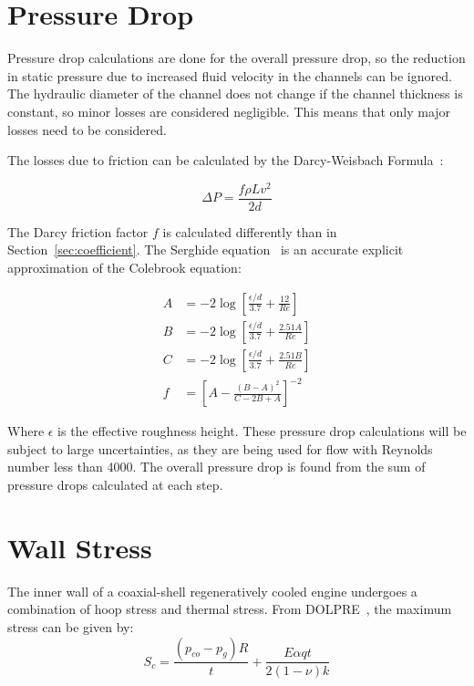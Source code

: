 \documentclass[11pt]{article}
\begin{document}
\section{Pressure Drop}

Pressure drop calculations are done for the overall pressure drop, so the reduction in static pressure due to increased fluid velocity in the channels can be ignored. The hydraulic diameter of the channel does not change if the channel thickness is constant, so minor losses are considered negligible. This means that only major losses need to be considered.

The losses due to friction can be calculated by the Darcy-Weisbach Formula~\cite{2009crane}:

\begin{equation}
  \Delta P = \frac{f \rho L v^2}{2d}
\end{equation}

The Darcy friction factor $f$ is calculated differently than in Section~\ref{sec:coefficient}. The Serghide equation~\cite{2009crane} is an accurate explicit approximation of the Colebrook equation:

\begin{align}
  A & = -2 \log \left[\frac{\epsilon / d}{3.7} + \frac{12}{Re} \right] \nonumber \\
  B & = -2 \log \left[ \frac{\epsilon / d}{3.7} + \frac{2.51A}{Re}\right] \nonumber \\
  C & = -2 \log \left[ \frac{\epsilon / d}{3.7} + \frac{2.51B}{Re}\right] \nonumber \\
  f & = \left[ A - \frac{(B - A)^2 }{C - 2B + A} \right]^{-2}
\end{align}

Where $\epsilon$ is the effective roughness height. These pressure drop calculations will be subject to large uncertainties, as they are being used for flow with Reynolds number less than 4000. The overall pressure drop is found from the sum of pressure drops calculated at each step.

\section{Wall Stress}

The inner wall of a coaxial-shell regeneratively cooled engine undergoes a combination of hoop stress and thermal stress. From DOLPRE~\cite{huang_modern_1992}, the maximum stress can be given by:
\begin{equation}
  S_c = \frac{(p_{co} -p_{g}) R}{t} + \frac{E \alpha q t}{2 (1 - \nu)k}
\end{equation}
\end{document}
